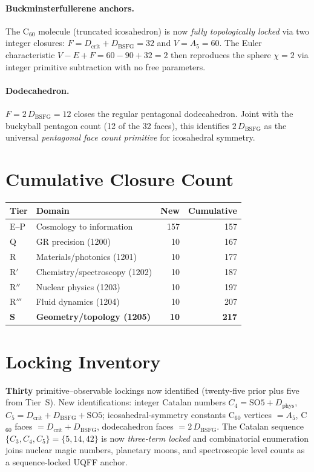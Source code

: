 \documentclass[11pt]{article}
\newcommand{\Dphys}{D_{\mathrm{phys}}}
\newcommand{\Dbsfg}{D_{\mathrm{BSFG}}}
\newcommand{\Dcrit}{D_{\mathrm{crit}}}
\newcommand{\SOfive}{\mathrm{SO5}}
\newcommand{\Afive}{A_{5}}
\begin{document}
\paragraph{Buckminsterfullerene anchors.}
The C$_{60}$ molecule (truncated icosahedron) is now \emph{fully topologically
locked} via two integer closures: $F = \Dcrit + \Dbsfg = 32$ and
$V = \Afive = 60$. The Euler characteristic
$V - E + F = 60 - 90 + 32 = 2$ then reproduces the sphere $\chi=2$ via integer
primitive subtraction with no free parameters.

\paragraph{Dodecahedron.}
$F = 2\,\Dbsfg = 12$ closes the regular pentagonal dodecahedron. Joint with
the buckyball pentagon count (12 of the 32 faces), this identifies
$2\,\Dbsfg$ as the universal \emph{pentagonal face count primitive} for
icosahedral symmetry.

\section{Cumulative Closure Count}

\begin{tabular}{@{}llrr@{}}
\toprule
Tier & Domain & New & Cumulative \\
\midrule
E--P & Cosmology to information & 157 & 157 \\
Q & GR precision (1200) & 10 & 167 \\
R & Materials/photonics (1201) & 10 & 177 \\
R$'$ & Chemistry/spectroscopy (1202) & 10 & 187 \\
R$''$ & Nuclear physics (1203) & 10 & 197 \\
R$'''$ & Fluid dynamics (1204) & 10 & 207 \\
\textbf{S} & \textbf{Geometry/topology (1205)} & \textbf{10} & \textbf{217} \\
\bottomrule
\end{tabular}

\section{Locking Inventory}
\textbf{Thirty} primitive--observable lockings now identified (twenty-five
prior plus five from Tier~S). New identifications: integer Catalan numbers
$C_4 = \SOfive+\Dphys$, $C_5 = \Dcrit+\Dbsfg+\SOfive$; icosahedral-symmetry
constants C$_{60}$ vertices $= \Afive$, C$_{60}$ faces $= \Dcrit+\Dbsfg$,
dodecahedron faces $= 2\,\Dbsfg$. The Catalan sequence
$\{C_3, C_4, C_5\} = \{5, 14, 42\}$ is now \emph{three-term locked} and
combinatorial enumeration joins nuclear magic numbers, planetary moons, and
spectroscopic level counts as a sequence-locked UQFF anchor.
\end{document}
